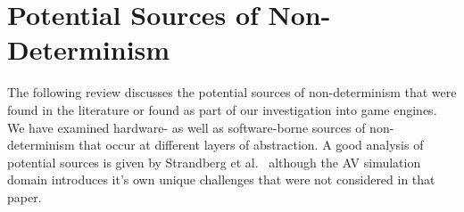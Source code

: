 \documentclass[letterpaper, 10 pt, journal, twoside]{IEEEtran}
\begin{document}
\section{Potential Sources of Non-Determinism} \label{s:nondeterminisimSources}

The following review discusses the potential sources of non-determinism that were found in the literature or found as part of our investigation into game engines. We have examined hardware- as well as software-borne sources of non-determinism that occur at different layers of abstraction. 
%
%
%
A good analysis of potential sources is given by Strandberg et al.~\cite{intermittently-failing-tests} although the AV simulation domain introduces it's own unique challenges that were not considered in that paper.



\medskip

\end{document}
